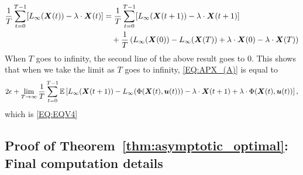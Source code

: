 \begin{align*}
     \frac1T\sum_{t = 0}^{T-1} [ L_\infty({\bm{X}(t)}) - \lambda \cdot{\bm{X}(t)}] &= \frac1T\sum_{t = 0}^{T-1} [ L_{\infty}({\bm{X}(t+1)}) - \lambda \cdot {\bm{X}(t+1)}]\\
     &\quad+ \frac1T\left(L_{\infty}({\bm{X}(0)}) - L_{\infty}({\bm{X}(T)}) +\lambda \cdot {\bm{X}(0)} - \lambda \cdot {\bm{X}(T)}\right)
\end{align*}
When $T$ goes to infinity, the second line of the above result goes to $0$. This shows that when we take the limit as $T$ goes to infinity, \eqref{EQ:APX_(A)} is equal to
\begin{align*}
    2\epsilon + \lim_{T\to\infty} \frac1T \sum_{t=0}^{T-1} \mathbb{E} \left[L_{\infty}({\bm{X}}(t + 1)) - L_{\infty}(\Phi({\bm{X}}(t), \bm{u}(t))) - \lambda\cdot{\bm{X}}(t + 1)  + \lambda \cdot\Phi({\bm{X}}(t), \bm{u}(t)) \right],
\end{align*}
which is \eqref{EQ:EQV4}

\subsection{Proof of Theorem~\ref{thm:asymptotic_optimal}: Final computation details}
\label{apx:C5}

